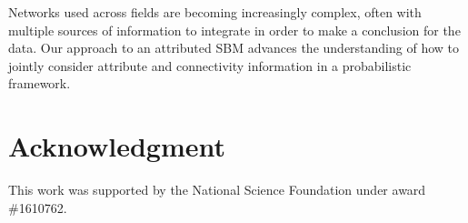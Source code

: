 \documentclass[journal]{IEEEtran}
\begin{document}
Networks used across fields are becoming increasingly complex, often with multiple sources of information to integrate in order to make a conclusion for the data. Our approach to an attributed SBM advances the understanding of how to jointly consider attribute and connectivity information in a probabilistic framework.  

\section*{Acknowledgment}
This work was supported by the National Science Foundation under award \#1610762.





\end{document}
